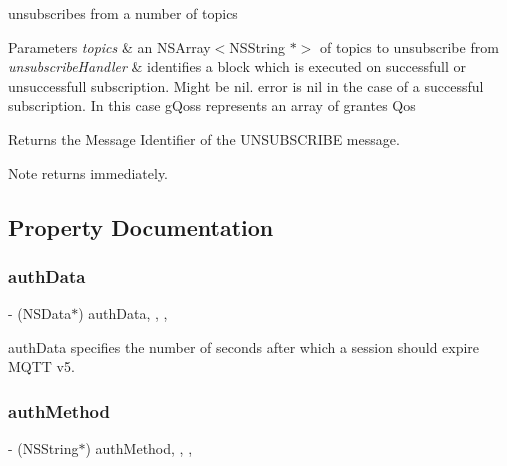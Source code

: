 unsubscribes from a number of topics


\begin{DoxyParams}{Parameters}
{\em topics} & an N\+S\+Array$<$\+N\+S\+String $\ast$$>$ of topics to unsubscribe from\\
\hline
{\em unsubscribe\+Handler} & identifies a block which is executed on successfull or unsuccessfull subscription. Might be nil. error is nil in the case of a successful subscription. In this case g\+Qoss represents an array of grantes Qos\\
\hline
\end{DoxyParams}
\begin{DoxyReturn}{Returns}
the Message Identifier of the U\+N\+S\+U\+B\+S\+C\+R\+I\+BE message.
\end{DoxyReturn}
\begin{DoxyNote}{Note}
returns immediately. 
\end{DoxyNote}


\subsection{Property Documentation}
\mbox{\label{interface_m_q_t_t_session_a79dde69bcc1d7dbd56a30affeb994c20}} 
\subsubsection{\texorpdfstring{auth\+Data}{authData}}
{\footnotesize\ttfamily -\/ (N\+S\+Data$\ast$) auth\+Data\hspace{0.3cm}{\ttfamily [read]}, {\ttfamily [write]}, {\ttfamily [nonatomic]}, {\ttfamily [strong]}}

auth\+Data specifies the number of seconds after which a session should expire M\+Q\+TT v5. \mbox{\label{interface_m_q_t_t_session_a66319af49757a922a90fe0ad96ab9fac}} 
\subsubsection{\texorpdfstring{auth\+Method}{authMethod}}
{\footnotesize\ttfamily -\/ (N\+S\+String$\ast$) auth\+Method\hspace{0.3cm}{\ttfamily [read]}, {\ttfamily [write]}, {\ttfamily [nonatomic]}, {\ttfamily [strong]}}

